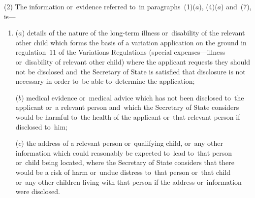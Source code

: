 \documentclass[12pt,a4paper]{article}
\begin{document}
(2) The information or~evidence referred to~in paragraphs~(1)($a$), (4)($a$)  and~(7), is—
\begin{enumerate}\item[]
($a$) details of the nature of the long-term illness or~disability of the relevant other child which forms the basis of a variation application on the ground in regulation~11 of the Variations Regulations (special expenses—illness or~disability of relevant other child) where the applicant requests they should not be disclosed and~the 
Secretary of State  %
is satisfied that disclosure is not necessary in order to~be able to~determine the application;

($b$) medical evidence or~medical advice which has not been disclosed to~the applicant or~a relevant person and~which the 
Secretary of State  %
considers would be harmful to~the health of the applicant or~that relevant person if disclosed to~him;

($c$) the address of a relevant person or~qualifying child, or~any other information which could reasonably be expected to~lead to~that person or~child being located, where the 
Secretary of State  %
considers that there would be a risk of harm or~undue distress to~that person or~that child or~any other children living with that person if the address or~information were disclosed.
\end{enumerate}
\end{document}
